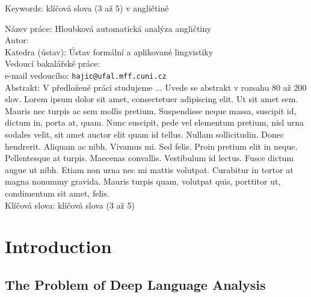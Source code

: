 \documentclass[12pt,notitlepage]{report}
\begin{document}
\noindent Keywords: klíčová slova (3 až 5) v angličtině

\vspace{10mm}
\noindent
Název práce: Hloubková automatická analýza angličtiny\\
Autor: \theauthor\\
Katedra (ústav): Ústav formální a aplikované lingvistiky\\
Vedoucí bakalářské práce: \thesupervisor\\
e-mail vedoucího: \texttt{hajic@ufal.mff.cuni.cz}\\

\noindent Abstrakt:  V předložené práci studujeme ... Uvede se abstrakt v rozsahu 80 až 200 slov. Lorem ipsum dolor sit amet, consectetuer adipiscing elit. Ut sit amet sem. Mauris nec turpis ac sem mollis pretium. Suspendisse neque massa, suscipit id, dictum in, porta at, quam. Nunc suscipit, pede vel elementum pretium, nisl urna sodales velit, sit amet auctor elit quam id tellus. Nullam sollicitudin. Donec hendrerit. Aliquam ac nibh. Vivamus mi. Sed felis. Proin pretium elit in neque. Pellentesque at turpis. Maecenas convallis. Vestibulum id lectus. Fusce dictum augue ut nibh. Etiam non urna nec mi mattis volutpat. Curabitur in tortor at magna nonummy gravida. Mauris turpis quam, volutpat quis, porttitor ut, condimentum sit amet, felis.\\

\noindent Klíčová slova: klíčová slova (3 až 5)


\cleardoublepage

%
%
\chapter{Introduction}\label{intro}
%
%

\section{The Problem of Deep Language Analysis}\label{problem}
\end{document}
